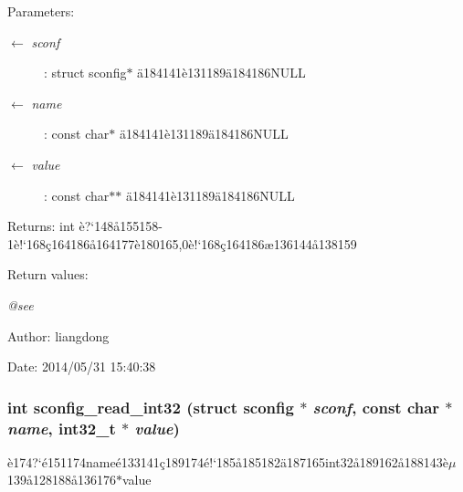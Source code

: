 \begin{Desc}
\item[Parameters:]
\begin{description}
\item[\mbox{$\leftarrow$} {\em sconf}]: struct sconfig$\ast$ \"{a}184141\`{e}131189\"{a}184186NULL \item[\mbox{$\leftarrow$} {\em name}]: const char$\ast$ \"{a}184141\`{e}131189\"{a}184186NULL \item[\mbox{$\leftarrow$} {\em value}]: const char$\ast$$\ast$ \"{a}184141\`{e}131189\"{a}184186NULL \end{description}
\end{Desc}
\begin{Desc}
\item[Returns:]int \`{e}?`148\aa{}155158-1\`{e}!`168\c{c}164186\aa{}164177\`{e}180165,0\`{e}!`168\c{c}164186\ae{}136144\aa{}138159 \end{Desc}
\begin{Desc}
\item[Return values:]
\begin{description}
\item[{\em @see}]\end{description}
\end{Desc}
\begin{Desc}
\item[Author:]liangdong \end{Desc}
\begin{Desc}
\item[Date:]2014/05/31 15:40:38 \end{Desc}
\subsubsection{\setlength{\rightskip}{0pt plus 5cm}int sconfig\_\-read\_\-int32 (struct sconfig $\ast$ {\em sconf}, const char $\ast$ {\em name}, int32\_\-t $\ast$ {\em value})}\label{sconfig_8h_a4}


\`{e}174?`\'{e}151174name\'{e}133141\c{c}189174\'{e}!`185\aa{}185182\"{a}187165int32\aa{}189162\aa{}188143\`{e}$\mu$139\aa{}128188\aa{}136176$\ast$value 

